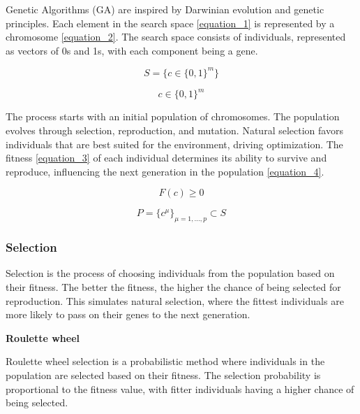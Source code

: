 \documentclass[11pt, a4paper]{article}
\begin{document}
Genetic Algorithms (GA) are inspired by Darwinian evolution and genetic principles. Each element in the search space \eqref{equation_1} is represented by a 
chromosome \eqref{equation_2}. The search space consists of individuals, represented as vectors of 0s and 1s, with each component being a gene.

\begin{equation}
    S = \{c \in \{0, 1\}^{m}\}
    \label{equation_1}
\end{equation}

\begin{equation}
   c \in \{0, 1\}^{m}
    \label{equation_2}
\end{equation}

The process starts with an initial population of chromosomes. The population evolves through selection, reproduction, and mutation. Natural selection favors 
individuals that are best suited for the environment, driving optimization. The fitness \eqref{equation_3} of each individual determines its ability to survive and reproduce, 
influencing the next generation in the population \eqref{equation_4}.

\begin{equation}
    F(c) \geq 0
    \label{equation_3}
\end{equation}

\begin{equation}
    P = \{c^{\mu}\}_{\mu=1,...,p} \subset S
    \label{equation_4}
\end{equation}

\subsubsection{Selection}

Selection \cite{WikipediaSelection} is the process of choosing individuals from the population based on their fitness. The better the fitness, the higher the chance of being 
selected for reproduction. This simulates natural selection, where the fittest individuals are more likely to pass on their genes to the next generation.

\vspace{1em}\textbf{Roulette wheel}

Roulette wheel selection is a probabilistic method where individuals in the population are selected based on their fitness. The selection probability is proportional to the 
fitness value, with fitter individuals having a higher chance of being selected.
\end{document}
